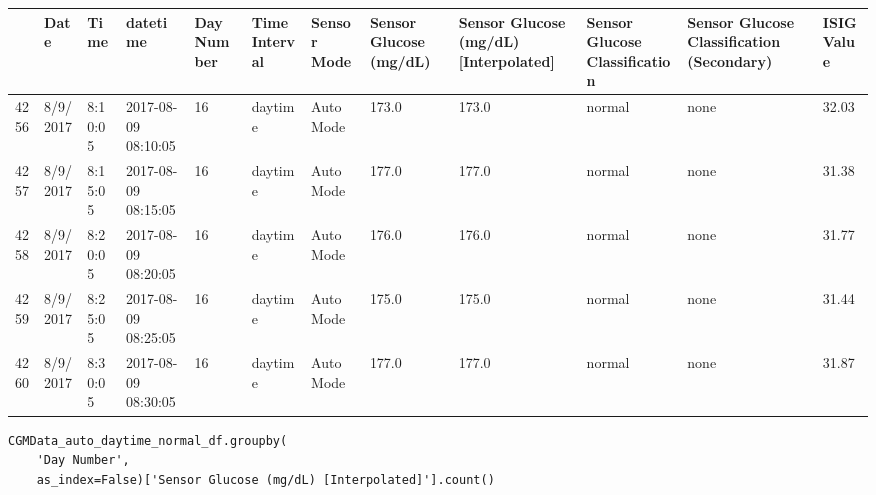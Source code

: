 \bigskip\noindent
\begin{tabular}{p{}p{}p{}p{}p{}p{}p{}p{}p{}p{}p{}p{}}
\toprule
 & Date & Time & datetime & Day Number & Time Interval & Sensor Mode & Sensor Glucose (mg/dL) & Sensor Glucose (mg/dL) [Interpolated] & Sensor Glucose Classification & Sensor Glucose Classification (Secondary) & ISIG Value \\
\hline
4256 & 8/9/2017 & 8:10:05 & 2017-08-09 08:10:05 & 16 & daytime & Auto Mode & 173.0 & 173.0 & normal & none & 32.03 \\
\hline
4257 & 8/9/2017 & 8:15:05 & 2017-08-09 08:15:05 & 16 & daytime & Auto Mode & 177.0 & 177.0 & normal & none & 31.38 \\
\hline
4258 & 8/9/2017 & 8:20:05 & 2017-08-09 08:20:05 & 16 & daytime & Auto Mode & 176.0 & 176.0 & normal & none & 31.77 \\
\hline
4259 & 8/9/2017 & 8:25:05 & 2017-08-09 08:25:05 & 16 & daytime & Auto Mode & 175.0 & 175.0 & normal & none & 31.44 \\
\hline
4260 & 8/9/2017 & 8:30:05 & 2017-08-09 08:30:05 & 16 & daytime & Auto Mode & 177.0 & 177.0 & normal & none & 31.87 \\
\hline
\bottomrule
\end{tabular}

\bigskip

\begin{verbatim}
CGMData_auto_daytime_normal_df.groupby(
    'Day Number', 
    as_index=False)['Sensor Glucose (mg/dL) [Interpolated]'].count()
\end{verbatim}

